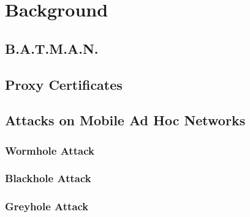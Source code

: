 \chapter{Background}\label{background}

\section{B.A.T.M.A.N.}\label{ad_hoc_network} 

\section{Proxy Certificates}\label{authentication}

\section{Attacks on Mobile Ad Hoc Networks}
\subsection{Wormhole Attack}
\subsection{Blackhole Attack}
\subsection{Greyhole Attack}
